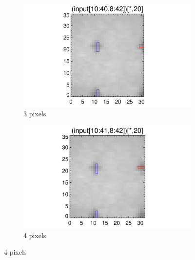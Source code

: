 \documentclass[10pt]{article}
\begin{document}
\begin{figure}[!h]
   \begin{subfigure}[b]{.45\linewidth}
        \centering
        \includegraphics[width=1.3\textwidth]{plots_tables_images/fidcheck_withbothtruncate2.png}
        \caption{3 pixels}
    \end{subfigure}
    \begin{subfigure}[b]{.45\linewidth}
        \centering
        \includegraphics[width=1.3\textwidth]{plots_tables_images/fidcheck_withbothtruncate3.png}
        \caption{4 pixels}
    \end{subfigure}


\end{figure}
\end{document}
